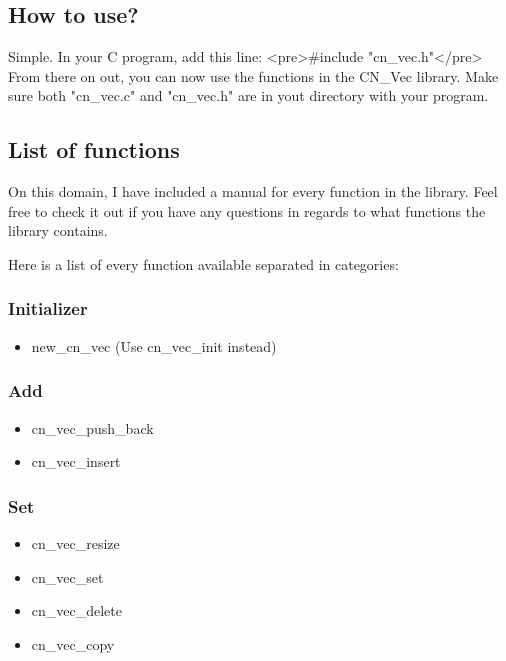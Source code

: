 \documentclass[12pt]{article}
\begin{document}
\subsection{How to use?}
	Simple. In your C program, add this line:
	<pre>#include "cn_vec.h"</pre>
	From there on out, you can now use the functions in the CN_Vec library. Make sure both "cn_vec.c" and "cn_vec.h" are in yout directory with your program.


\subsection{List of functions}On this domain, I have included a manual for every function in the library. Feel free to check it out if you have any questions in regards to what functions the library contains.

Here is a list of every function available separated in categories:

\subsubsection{Initializer}\begin{itemize}
	\item new_cn_vec (Use cn_vec_init instead)

\end{itemize}
\subsubsection{Add}\begin{itemize}
	\item cn_vec_push_back

	\item cn_vec_insert

\end{itemize}
\subsubsection{Set}\begin{itemize}
	\item cn_vec_resize

	\item cn_vec_set

	\item cn_vec_delete

	\item cn_vec_copy

\end{itemize}
\end{document}
